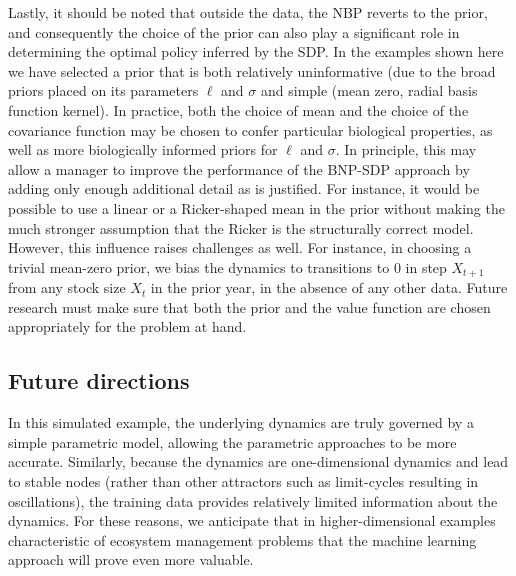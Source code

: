 \documentclass[author-year, review]{elsarticle} %
\begin{document}
Lastly, it should be noted that outside the data, the NBP reverts to the
prior, and consequently the choice of the prior can also play a
significant role in determining the optimal policy inferred by the SDP.
In the examples shown here we have selected a prior that is both
relatively uninformative (due to the broad priors placed on its
parameters $\ell$ and $\sigma$ and simple (mean zero, radial basis
function kernel). In practice, both the choice of mean and the choice of
the covariance function may be chosen to confer particular biological
properties, as well as more biologically informed priors for $\ell$ and
$\sigma$. In principle, this may allow a manager to improve the
performance of the BNP-SDP approach by adding only enough additional
detail as is justified. For instance, it would be possible to use a
linear or a Ricker-shaped mean in the prior without making the much
stronger assumption that the Ricker is the structurally correct model.
However, this influence raises challenges as well. For instance, in
choosing a trivial mean-zero prior, we bias the dynamics to transitions
to 0 in step $X_{t+1}$ from any stock size $X_t$ in the prior year, in
the absence of any other data. Future research must make sure that both
the prior and the value function are chosen appropriately for the
problem at hand.

\subsection{Future directions}\label{future-directions}

In this simulated example, the underlying dynamics are truly governed by
a simple parametric model, allowing the parametric approaches to be more
accurate. Similarly, because the dynamics are one-dimensional dynamics
and lead to stable nodes (rather than other attractors such as
limit-cycles resulting in oscillations), the training data provides
relatively limited information about the dynamics. For these reasons, we
anticipate that in higher-dimensional examples characteristic of
ecosystem management problems that the machine learning approach will
prove even more valuable.
\end{document}
